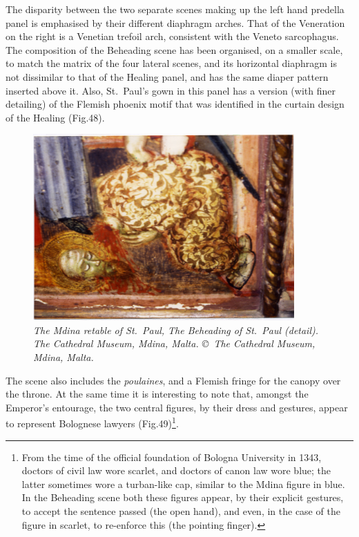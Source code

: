 \documentclass[a4paper,12pt]{article}
\begin{document}
The disparity between the two separate scenes making up the left hand
predella panel is emphasised by their different diaphragm arches.
That of the Veneration on the right is a Venetian trefoil arch,
consistent with the Veneto sarcophagus. The composition of the
Beheading scene has been organised, on a smaller scale, to match the
matrix of the four lateral scenes, and its horizontal diaphragm is not
dissimilar to that of the Healing panel, and has the same diaper
pattern inserted above it. Also, St.~Paul's gown in this panel has a
version (with finer detailing) of the Flemish phoenix motif that was
identified in the curtain design of the Healing (Fig.48). 
\begin{figure}[htbp]
\centering
\includegraphics[width=10cm]{pics/fig48.png}
\caption[The Mdina retable of St.~Paul, The Beheading of St.~Paul (detail)] 
{\it The Mdina retable of St.~Paul, The Beheading of St.~Paul (detail).
The Cathedral Museum, Mdina, Malta. \copyright\ The Cathedral Museum,
  Mdina, Malta.} 
\end{figure}
The scene
also includes the \textit{poulaines}, and a Flemish fringe for the
canopy over the throne. At the same time it is interesting to note
that, amongst the Emperor's entourage, the two central figures, by
their dress and gestures, appear to represent Bolognese lawyers
(Fig.49)\footnote{From the time of the official foundation of Bologna
University in 1343, doctors of civil law wore scarlet, and doctors of
canon law wore blue; the latter sometimes wore a turban-like cap,
similar to the Mdina figure in blue. In the Beheading scene both these
figures appear, by their explicit gestures, to accept the sentence
passed (the open hand), and even, in the case of the figure in
scarlet, to re-enforce this (the pointing finger).}.
\end{document}
